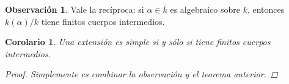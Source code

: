 \documentclass[12pt]{book}
\newtheorem{cor}[teo]{Corolario}
\theoremstyle{definition}
\newtheorem{obs}[teo]{Observación}
\begin{document}
\begin{obs}
Vale la recíproca: si $\alpha\in\overline{k}$ es algebraico sobre $k$, entonces $k(\alpha)/k$ tiene finitos cuerpos intermedios.
\end{obs}

\begin{cor}
Una extensión es simple si y sólo si tiene finitos cuerpos intermedios.
\begin{proof}
Simplemente es combinar la observación y el teorema anterior.
\end{proof}
\end{cor}
\end{document}
